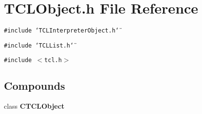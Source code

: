 \section{TCLObject.h File Reference}
\label{TCLObject_8h}
{\tt \#include \char`\"{}TCLInterpreter\-Object.h\char`\"{}}\par
{\tt \#include \char`\"{}TCLList.h\char`\"{}}\par
{\tt \#include $<$tcl.h$>$}\par
\subsection*{Compounds}
\begin{CompactItemize}
\item 
class {\bf CTCLObject}
\end{CompactItemize}
